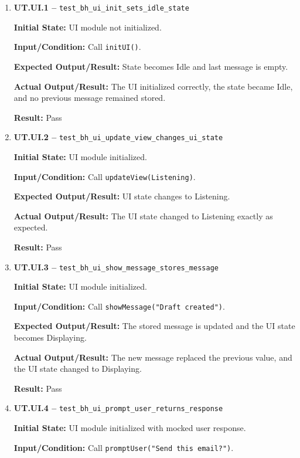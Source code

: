 \documentclass[12pt]{article}
\begin{document}
\begin{enumerate}
    \item \textbf{UT.UI.1 --}
    \texttt{test\_bh\_ui\_init\_sets\_idle\_state}
    
    \textbf{Initial State:} UI module not initialized.
    
    \textbf{Input/Condition:} Call \texttt{initUI()}.
    
    \textbf{Expected Output/Result:} State becomes Idle and last
    message is empty.
    
    \textbf{Actual Output/Result:} The UI initialized correctly, the
    state became Idle, and no previous message remained stored.
    
    \textbf{Result:} Pass
    
    \item \textbf{UT.UI.2 --}
    \texttt{test\_bh\_ui\_update\_view\_changes\_ui\_state}
    
    \textbf{Initial State:} UI module initialized.
    
    \textbf{Input/Condition:} Call \texttt{updateView(Listening)}.
    
    \textbf{Expected Output/Result:} UI state changes to Listening.
    
    \textbf{Actual Output/Result:} The UI state changed to Listening
    exactly as expected.
    
    \textbf{Result:} Pass
    
    \item \textbf{UT.UI.3 --}
    \texttt{test\_bh\_ui\_show\_message\_stores\_message}
    
    \textbf{Initial State:} UI module initialized.
    
    \textbf{Input/Condition:} Call
    \texttt{showMessage("Draft created")}.
    
    \textbf{Expected Output/Result:} The stored message is updated and
    the UI state becomes Displaying.
    
    \textbf{Actual Output/Result:} The new message replaced the
    previous value, and the UI state changed to Displaying.
    
    \textbf{Result:} Pass
    
    \item \textbf{UT.UI.4 --}
    \texttt{test\_bh\_ui\_prompt\_user\_returns\_response}
    
    \textbf{Initial State:} UI module initialized with mocked user
    response.
    
    \textbf{Input/Condition:} Call
    \texttt{promptUser("Send this email?")}.
    

\end{enumerate}
\end{document}
